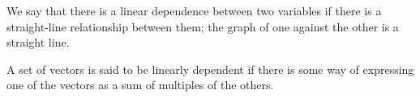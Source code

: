 We say that there is a linear dependence between two variables if there
is a straight-line relationship between them; the graph of one against 
the other is a straight line.
\par
A set of vectors is said to be linearly dependent if there is some way
of expressing one of the vectors as a sum of multiples of the others.